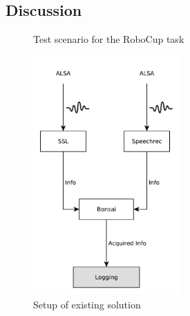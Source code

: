 \subsection{Discussion}


\begin{figure}[]
	\centering
	\caption{Test scenario for the RoboCup task}
	\label{pic:eval_task}
\end{figure}

\begin{figure}[]
	\centering
	\includegraphics[width=0.5\textwidth]{diagrams/eval_task_old.pdf}
	\caption{Setup of existing solution}
	\label{pic:eval_task_setup_old}
\end{figure}


